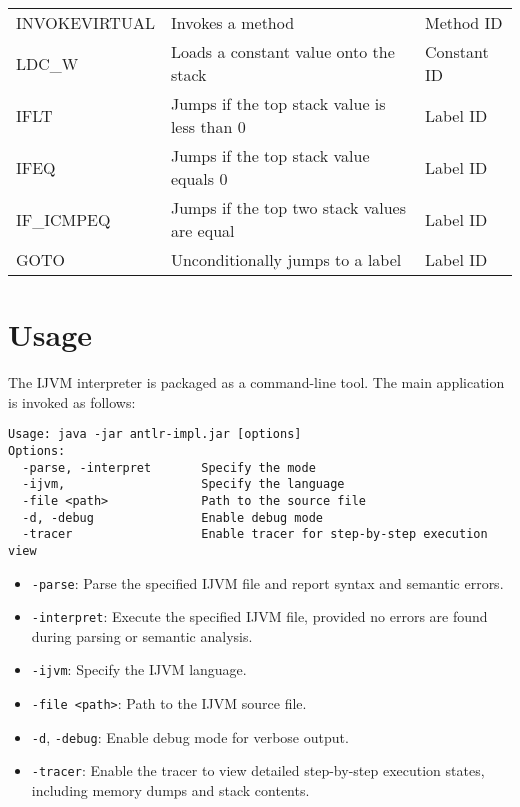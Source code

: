 \documentclass[11pt]{article}
\begin{document}
\begin{table}[H]
{\begin{tabular}{|l|l|l|}
INVOKEVIRTUAL & Invokes a method                                  					& Method ID \\
LDC\_W          	& Loads a constant value onto the stack             			& Constant ID \\
IFLT            		& Jumps if the top stack value is less than 0       			& Label ID \\
IFEQ            		& Jumps if the top stack value equals 0             				& Label ID \\
IF\_ICMPEQ      	& Jumps if the top two stack values are equal       			& Label ID \\
GOTO            		& Unconditionally jumps to a label                 				& Label ID \\
\hline
\end{tabular}
}
\end{table}

\section{Usage}
The IJVM interpreter is packaged as a command-line tool. The main application is invoked as follows:

\begin{verbatim}
Usage: java -jar antlr-impl.jar [options]
Options:
  -parse, -interpret       Specify the mode
  -ijvm,                   Specify the language
  -file <path>             Path to the source file
  -d, -debug               Enable debug mode
  -tracer                  Enable tracer for step-by-step execution view
\end{verbatim}

\begin{itemize}
    \item \texttt{-parse}: Parse the specified IJVM file and report syntax and semantic errors.
    \item \texttt{-interpret}: Execute the specified IJVM file, provided no errors are found during parsing or semantic analysis.
    \item \texttt{-ijvm}: Specify the IJVM language.
    \item \texttt{-file <path>}: Path to the IJVM source file.
    \item \texttt{-d}, \texttt{-debug}: Enable debug mode for verbose output.
    \item \texttt{-tracer}: Enable the tracer to view detailed step-by-step execution states, including memory dumps and stack contents.
\end{itemize}
\end{document}
